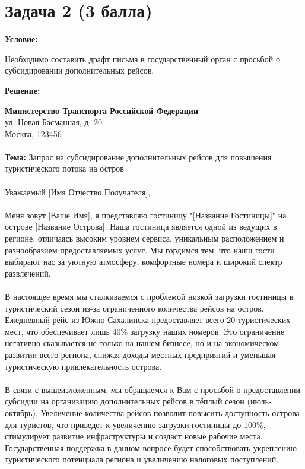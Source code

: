 \documentclass[a4paper,12pt]{article}
\begin{document}
\section*{Задача 2 (3 балла)}

\textbf{Условие:} 

Необходимо составить драфт письма в государственный орган с просьбой о субсидировании дополнительных рейсов.

\textbf{Решение:}

\begin{flushleft}
\textbf{Министерство Транспорта Российской Федерации} \\
ул. Новая Басманная, д. 20 \\
Москва, 123456 \\
\\
\textbf{Тема:} Запрос на субсидирование дополнительных рейсов для повышения туристического потока на остров \\
\\
Уважаемый [Имя Отчество Получателя], \\
\\
Меня зовут [Ваше Имя], я представляю гостиницу "[Название Гостиницы]" на острове [Название Острова]. Наша гостиница является одной из ведущих в регионе, отличаясь высоким уровнем сервиса, уникальным расположением и разнообразием предоставляемых услуг. Мы гордимся тем, что наши гости выбирают нас за уютную атмосферу, комфортные номера и широкий спектр развлечений. \\
\\
В настоящее время мы сталкиваемся с проблемой низкой загрузки гостиницы в туристический сезон из-за ограниченного количества рейсов на остров. Ежедневный рейс из Южно-Сахалинска предоставляет всего 20 туристических мест, что обеспечивает лишь 40\% загрузку наших номеров. Это ограничение негативно сказывается не только на нашем бизнесе, но и на экономическом развитии всего региона, снижая доходы местных предприятий и уменьшая туристическую привлекательность острова. \\
\\
В связи с вышеизложенным, мы обращаемся к Вам с просьбой о предоставлении субсидии на организацию дополнительных рейсов в тёплый сезон (июль-октябрь). Увеличение количества рейсов позволит повысить доступность острова для туристов, что приведет к увеличению загрузки гостиницы до 100\%, стимулирует развитие инфраструктуры и создаст новые рабочие места. Государственная поддержка в данном вопросе будет способствовать укреплению туристического потенциала региона и увеличению налоговых поступлений. \\

\end{flushleft}
\end{document}
